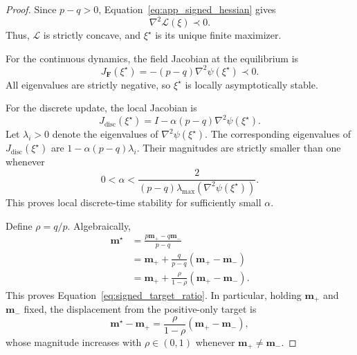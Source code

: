 \documentclass[sigconf,anonymous,review]{acmart}
\theoremstyle{acmdefinition}
\begin{document}
\begin{proof}
Since \(p-q>0\), Equation~\eqref{eq:app_signed_hessian} gives
\begin{equation}
    \nabla^2\mathcal L(\xi)
    \prec0.
\end{equation}
Thus, \(\mathcal L\) is strictly concave, and
\(\xi^\star\) is its unique finite maximizer.

For the continuous dynamics, the field Jacobian at the equilibrium is
\begin{equation}
    J_{\mathbf F}(\xi^\star)
    =
    -(p-q)
    \nabla^2\psi(\xi^\star)
    \prec0.
    \label{eq:app_continuous_jacobian}
\end{equation}
All eigenvalues are strictly negative, so
\(\xi^\star\) is locally asymptotically stable.

For the discrete update, the local Jacobian is
\begin{equation}
    J_{\mathrm{disc}}(\xi^\star)
    =
    I
    -
    \alpha(p-q)
    \nabla^2\psi(\xi^\star).
    \label{eq:app_discrete_jacobian}
\end{equation}
Let \(\lambda_i>0\) denote the eigenvalues of
\(\nabla^2\psi(\xi^\star)\). The corresponding eigenvalues of
\(J_{\mathrm{disc}}(\xi^\star)\) are
\(1-\alpha(p-q)\lambda_i\). Their magnitudes are strictly smaller than
one whenever
\begin{equation}
    0
    <
    \alpha
    <
    \frac{
        2
    }{
        (p-q)
        \lambda_{\max}
        \left(
            \nabla^2\psi(\xi^\star)
        \right)
    }.
    \label{eq:app_discrete_stepsize}
\end{equation}
This proves local discrete-time stability for sufficiently small
\(\alpha\).

Define \(\rho=q/p\). Algebraically,
\begin{equation}
\begin{aligned}
    \mathbf m^\star
    &=
    \frac{
        p\mathbf m_+
        -
        q\mathbf m_-
    }{
        p-q
    }
    \\
    &=
    \mathbf m_+
    +
    \frac{q}{p-q}
    \left(
        \mathbf m_+
        -
        \mathbf m_-
    \right)
    \\
    &=
    \mathbf m_+
    +
    \frac{\rho}{1-\rho}
    \left(
        \mathbf m_+
        -
        \mathbf m_-
    \right).
\end{aligned}
\label{eq:app_stable_extrapolation_identity}
\end{equation}
This proves Equation~\eqref{eq:signed_target_ratio}. In particular,
holding \(\mathbf m_+\) and \(\mathbf m_-\) fixed, the displacement from
the positive-only target is
\begin{equation}
    \mathbf m^\star-\mathbf m_+
    =
    \frac{\rho}{1-\rho}
    \left(
        \mathbf m_+
        -
        \mathbf m_-
    \right),
    \label{eq:app_equilibrium_displacement}
\end{equation}
whose magnitude increases with \(\rho\in(0,1)\) whenever
\(\mathbf m_+\neq\mathbf m_-\).


\end{proof}
\end{document}
